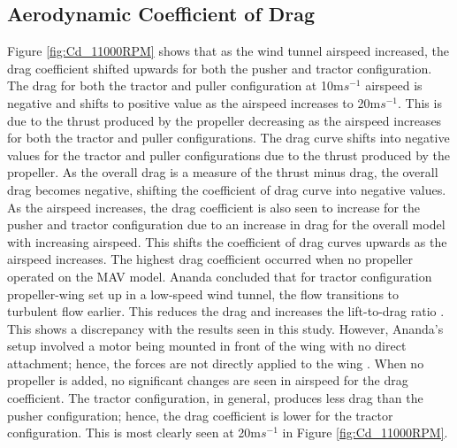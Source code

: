 \subsection{Aerodynamic Coefficient of Drag}
Figure \ref{fig:Cd_11000RPM} shows that as the wind tunnel airspeed increased, the drag coefficient shifted upwards for both the pusher and tractor configuration. The drag for both the tractor and puller configuration at 10m$s^{-1}$ airspeed is negative and shifts to positive value as the airspeed increases to 20m$s^{-1}$. This is due to the thrust produced by the propeller decreasing as the airspeed increases for both the tractor and puller configurations. The drag curve shifts into negative values for the tractor and puller configurations due to the thrust produced by the propeller. As the overall drag is a measure of the thrust minus drag, the overall drag becomes negative, shifting the coefficient of drag curve into negative values. As the airspeed increases, the drag coefficient is also seen to increase for the pusher and tractor configuration due to an increase in drag for the overall model with increasing airspeed. This shifts the coefficient of drag curves upwards as the airspeed increases. The highest drag coefficient occurred when no propeller operated on the MAV model. Ananda concluded that for tractor configuration propeller-wing set up in a low-speed wind tunnel, the flow transitions to turbulent flow earlier. This reduces the drag and increases the lift-to-drag ratio \cite{Ananda2018}. This shows a discrepancy with the results seen in this study. However, Ananda's setup involved a motor being mounted in front of the wing with no direct attachment; hence, the forces are not directly applied to the wing \cite{Ananda2018}. When no propeller is added, no significant changes are seen in airspeed for the drag coefficient. The tractor configuration, in general, produces less drag than the pusher configuration; hence, the drag coefficient is lower for the tractor configuration. This is most clearly seen at 20m$s^{-1}$ in Figure \ref{fig:Cd_11000RPM}. 




